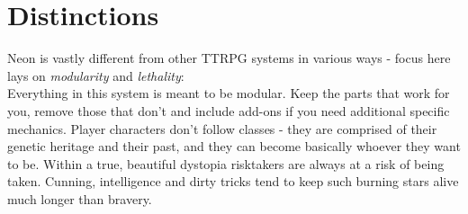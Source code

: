 \documentclass[12pt,a4paper,openany,usenames,dvipsnames]{book}
\begin{document}
	

	\chapter{Distinctions}
	Neon is vastly different from other TTRPG systems in various ways - focus here lays on \emph{modularity} and \emph{lethality}:\\
	Everything in this system is meant to be modular.
	Keep the parts that work for you,
		remove those that don't
		and include add-ons if you need additional specific mechanics.
	Player characters don't follow classes - they are comprised of their genetic heritage and their past,
		and they can become basically whoever they want to be.
	Within a true, beautiful dystopia risktakers are always at a risk of being taken.
	Cunning, intelligence and dirty tricks tend to keep such burning stars alive much longer than bravery.
\end{document}
